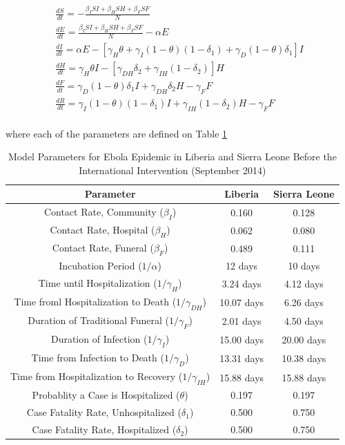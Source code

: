 \documentclass[10pt]{article}
\begin{document}
\begin{eqnarray} 
\frac{dS}{dt} = - \frac{\beta_{I}SI+\beta_{H}SH+\beta_{F}SF}{N}\\
\frac{dE}{dt} =  \frac{\beta_{I}SI+\beta_{H}SH+\beta_{F}SF}{N}-\alpha E\\
\frac{dI}{dt} =  \alpha E - [\gamma_{H}\theta + \gamma_{I}(1-\theta)(1-\delta_{1})+\gamma_{D}(1-\theta)\delta_{1}]I\\
\frac{dH}{dt} = \gamma_{H}\theta I - [\gamma_{DH}\delta_{2}+\gamma_{IH}(1-\delta_{2})]H\\
\frac{dF}{dt} = \gamma_{D}(1-\theta) \delta_{1} I + \gamma_{DH}\delta_{2} H-\gamma_{F} F\\
\frac{dR}{dt} = \gamma_{I}(1-\theta)(1- \delta_{1}) I + \gamma_{IH}(1-\delta_{2}) H-\gamma_{F} F
\end{eqnarray}\\

where each of the parameters are defined on Table \ref{tab:parameters} \\

\begin{table}[ht]
\caption{Model Parameters for Ebola Epidemic in Liberia and Sierra Leone Before the International Intervention (September 2014)} %
\centering %
\begin{tabular}{c c c } 
\hline\hline %
Parameter & Liberia & Sierra Leone \\ [0.5ex] %
\hline %
Contact Rate, Community  ($\beta_{I}$) & 0.160 & 0.128  \\ 
Contact Rate, Hospital  ($\beta_{H}$) & 0.062 & 0.080  \\
Contact Rate, Funeral  ($\beta_{F}$) & 0.489 & 0.111 \\
Incubation Period (${1}/{\alpha}$) & 12 days & 10 days  \\
Time until Hospitalization (${1}/{\gamma_{H}}$) & 3.24 days & 4.12 days  \\
Time froml Hospitalization to Death (${1}/{\gamma_{DH}}$) & 10.07 days & 6.26 days  \\ 
Duration of Traditional Funeral (${1}/{\gamma_{F}}$) & 2.01 days & 4.50 days  \\
Duration of Infection (${1}/{\gamma_{I}}$) & 15.00 days & 20.00 days  \\
Time from Infection to Death (${1}/{\gamma_{D}}$) & 13.31 days & 10.38 days  \\
Time from Hospitalization to Recovery (${1}/{\gamma_{IH}}$) & 15.88 days & 15.88 days  \\
Probablity a Case is Hospitalized ($\theta$) & 0.197 & 0.197  \\
Case Fatality Rate, Unhospitalized ($\delta_{1}$) & 0.500 & 0.750  \\
Case Fatality Rate, Hospitalized ($\delta_{2}$) & 0.500 & 0.750  \\ [1ex] 
\hline 
\end{tabular}
\label{tab:parameters}
\end{table}
\end{document}
